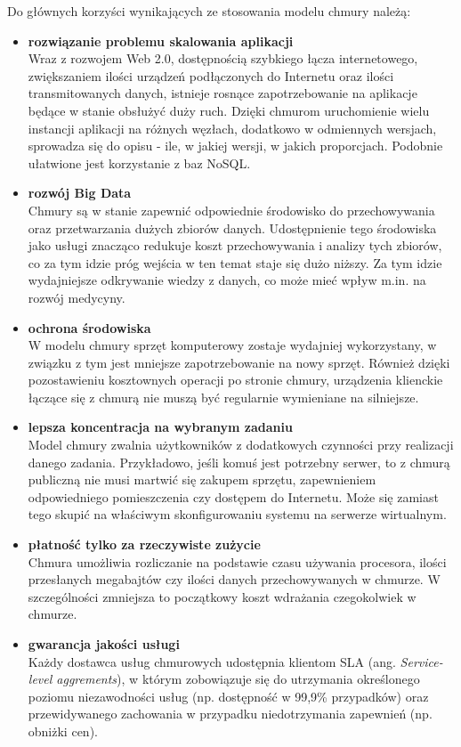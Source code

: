 \documentclass[12pt,a4paper,twoside,titlepage,openright]{book}
\begin{document}
Do głównych korzyści wynikających ze stosowania modelu chmury należą:
\begin{itemize}
\item \textbf{rozwiązanie problemu skalowania aplikacji }\\
Wraz z rozwojem Web 2.0, dostępnością szybkiego łącza internetowego, zwiększaniem ilości urządzeń podłączonych do Internetu oraz ilości transmitowanych danych, istnieje rosnące zapotrzebowanie na aplikacje będące w stanie obsłużyć duży ruch. Dzięki chmurom uruchomienie wielu instancji aplikacji na różnych węzłach, dodatkowo w odmiennych wersjach, sprowadza się do opisu - ile, w jakiej wersji, w jakich proporcjach.\cite{kubernetesOreily} Podobnie ułatwione jest korzystanie z baz NoSQL.

\item \textbf{rozwój Big Data} \\
Chmury są w stanie zapewnić odpowiednie środowisko do przechowywania oraz przetwarzania dużych zbiorów danych. Udostępnienie tego środowiska jako usługi znacząco redukuje koszt przechowywania i analizy tych zbiorów, co za tym idzie próg wejścia w ten temat staje się dużo niższy. Za tym idzie wydajniejsze odkrywanie wiedzy z danych, co może mieć wpływ m.in. na rozwój medycyny.

\item \textbf{ochrona środowiska} \\
W modelu chmury sprzęt komputerowy zostaje wydajniej wykorzystany, w związku z tym jest mniejsze zapotrzebowanie na nowy sprzęt. Również dzięki pozostawieniu kosztownych operacji po stronie chmury, urządzenia klienckie łączące się z chmurą nie muszą być regularnie wymieniane na silniejsze.

\item \textbf{lepsza koncentracja na wybranym zadaniu} \\
Model chmury zwalnia użytkowników z dodatkowych czynności przy realizacji danego zadania. Przykładowo, jeśli komuś jest potrzebny serwer, to z chmurą publiczną nie musi martwić się zakupem sprzętu, zapewnieniem odpowiedniego pomieszczenia czy dostępem do Internetu. Może się zamiast tego skupić na właściwym skonfigurowaniu systemu na serwerze wirtualnym. 

\item \textbf{płatność tylko za rzeczywiste zużycie} \\
Chmura umożliwia rozliczanie na podstawie czasu używania procesora, ilości przesłanych megabajtów czy ilości danych przechowywanych w chmurze. W szczególności zmniejsza to początkowy koszt wdrażania czegokolwiek w chmurze.

\item \textbf{gwarancja jakości usługi} \\
Każdy dostawca usług chmurowych udostępnia klientom SLA (ang. \textit{Service-level aggrements}), w którym zobowiązuje się do utrzymania określonego poziomu niezawodności usług (np. dostępność w 99,9\% przypadków) oraz przewidywanego zachowania w przypadku niedotrzymania zapewnień (np. obniżki cen).

\end{itemize}
\end{document}
